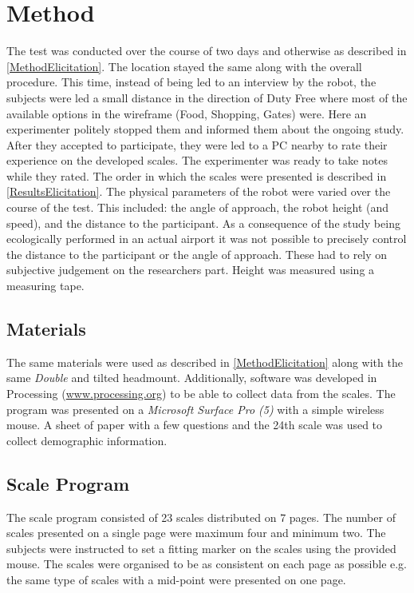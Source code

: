 \section{Method}
\label{Method2}
The test was conducted over the course of two days and otherwise as described in \autoref{MethodElicitation}. The location stayed the same along with the overall procedure. This time, instead of being led to an interview by the robot, the subjects were led a small distance in the direction of Duty Free where most of the available options in the wireframe (Food, Shopping, Gates) were. Here an experimenter politely stopped them and informed them about the ongoing study. After they accepted to participate, they were led to a PC nearby to rate their experience on the developed scales. The experimenter was ready to take notes while they rated. The order in which the scales were presented is described in \autoref{ResultsElicitation}. The physical parameters of the robot were varied over the course of the test. This included: the angle of approach, the robot height (and speed), and the distance to the participant. As a consequence of the study being ecologically performed in an actual airport it was not possible to precisely control the distance to the participant or the angle of approach. These had to rely on subjective judgement on the researchers part. Height was measured using a measuring tape.

\subsection{Materials}
The same materials were used as described in \autoref{MethodElicitation} along with the same \textit{Double} and tilted headmount. Additionally, software was developed in Processing (\url{www.processing.org}) to be able to collect data from the scales. The program was presented on a \textit{Microsoft Surface Pro (5)} with a simple wireless mouse. A sheet of paper with a few questions and the 24th scale was used to collect demographic information.

\subsection{Scale Program}
The scale program consisted of 23 scales distributed on 7 pages. The number of scales presented on a single page were maximum four and minimum two. The subjects were instructed to set a fitting marker on the scales using the provided mouse. The scales were organised to be as consistent on each page as possible e.g. the same type of scales with a mid-point were presented on one page.

